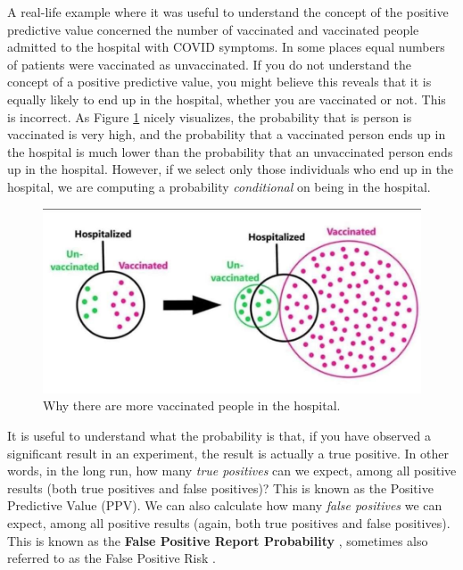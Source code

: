 \documentclass[
  oneside]{book}
\begin{document}
A real-life example where it was useful to understand the concept of the positive predictive value concerned the number of vaccinated and vaccinated people admitted to the hospital with COVID symptoms. In some places equal numbers of patients were vaccinated as unvaccinated. If you do not understand the concept of a positive predictive value, you might believe this reveals that it is equally likely to end up in the hospital, whether you are vaccinated or not. This is incorrect. As Figure \ref{fig:ppvhospital} nicely visualizes, the probability that is person is vaccinated is very high, and the probability that a vaccinated person ends up in the hospital is much lower than the probability that an unvaccinated person ends up in the hospital. However, if we select only those individuals who end up in the hospital, we are computing a probability \emph{conditional} on being in the hospital.



\begin{figure}

{\centering \includegraphics[width=1\linewidth]{images/hospitalvaccinated} 

}

\caption{Why there are more vaccinated people in the hospital.}\label{fig:ppvhospital}
\end{figure}

It is useful to understand what the probability is that, if you have observed a significant result in an experiment, the result is actually a true positive. In other words, in the long run, how many \emph{true positives} can we expect, among all positive results (both true positives and false positives)? This is known as the Positive Predictive Value (PPV). We can also calculate how many \emph{false positives} we can expect, among all positive results (again, both true positives and false positives). This is known as the \textbf{False Positive Report Probability} \citep{wacholder_assessing_2004}, sometimes also referred to as the False Positive Risk \citep{colquhoun_false_2019}.
\end{document}

